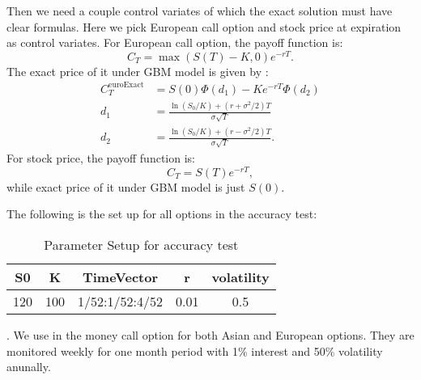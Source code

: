Then we need a couple control variates of which the exact solution must have clear formulas. 
Here we pick European call option and stock price at expiration as control variates.   
For European call option, the payoff function is: 
\[ C_{T} = \max (S(T)-K,0)e^{-rT}.\] 
The exact price of it under GBM model is given by \cite{boyle1977options}:  
\begin{align*}
    C_{T}^{\mathrm{euroExact}} &= S(0)\Phi(d_1)-Ke^{-rT}\Phi(d_2)\\
    d_1 &=\frac{\ln(S_0/K)+(r+\sigma^2/2)T}{\sigma\sqrt{T}}\\
    d_2 &=\frac{\ln(S_0/K)+(r-\sigma^2/2)T}{\sigma\sqrt{T}}.
\end{align*}
For stock price, the payoff function is: 
\[ C_{T} = S(T)e^{-rT},\] 
while exact price of it under GBM model is just $S(0)$.  

The following is the set up for all options in the accuracy test:
\begin{table}[h]
    \centering
	\caption{Parameter Setup for accuracy test}
	\begin{tabular}{ccccc}
		\hline\hline
        S0 & K & TimeVector & r & volatility \\[0.5ex]
        \hline
        120  & 100 & 1/52:1/52:4/52 & 0.01 & 0.5 \\[1ex] 
        \hline
	\end{tabular}
\end{table}.
We use in the money call option for both Asian and European options. 
They are monitored weekly for one month period with 1\% interest and 50\% volatility anunally. 

